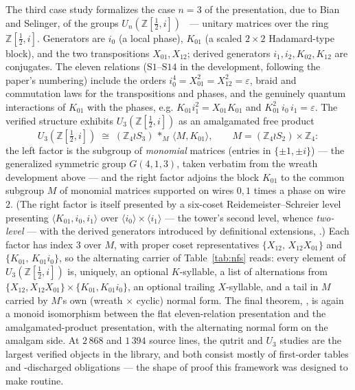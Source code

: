 The third case study formalizes the case $n = 3$ of the presentation, due
to Bian and Selinger, of the groups
$U_n(\mathbb{Z}[\tfrac12,i])$~\cite{bian2021un} --- unitary matrices over
the ring $\mathbb{Z}[\tfrac12,i]$.
Generators are $i_0$ (a local phase), $K_{01}$ (a scaled $2{\times}2$
Hadamard-type block), and the two transpositions $X_{01}, X_{12}$;
derived generators $i_1, i_2, K_{02}, K_{12}$ are conjugates.  The eleven
relations ($\mathrm{S1}$--$\mathrm{S14}$ in the development, following the
paper's numbering) include the orders $i_0^4 = X_{01}^2 = X_{12}^2 =
\varepsilon$, braid and commutation laws for the transpositions and
phases, and the genuinely quantum interactions of $K_{01}$ with the
phases, e.g.
$K_{01} i_1^2 = X_{01} K_{01}$ and
$K_{01}^2\, i_0\, i_1 = \varepsilon$.  The verified structure exhibits
$U_3(\mathbb{Z}[\tfrac12,i])$ as an amalgamated free product
\[
  U_3(\mathbb{Z}[\tfrac12,i]) \;\cong\;
  (\mathbb{Z}_4 \wr S_3)
  \,\ast_{M}\,
  \langle M, K_{01} \rangle,
  \qquad
  M = (\mathbb{Z}_4 \wr S_2) \times \mathbb{Z}_4 :
\]
the left factor is the subgroup of \emph{monomial} matrices (entries in
$\{\pm 1, \pm i\}$) --- the generalized symmetric group $G(4,1,3)$,
taken verbatim from the wreath development above --- and the right
factor adjoins the block $K_{01}$ to the common subgroup $M$ of
monomial matrices supported on wires $0, 1$ times a phase on wire $2$.
(The right factor is itself presented by a six-coset
Reidemeister--Schreier level presenting $\langle K_{01}, i_0, i_1
\rangle$ over $\langle i_0 \rangle \times \langle i_1 \rangle$ --- the
tower's second level, whence \emph{two-level} --- with the derived
generators introduced by definitional extensions, .)
Each factor has index $3$ over $M$, with proper coset representatives
$\{X_{12},\, X_{12}X_{01}\}$ and $\{K_{01},\, K_{01} i_0\}$, so the
alternating carrier of Table~\ref{tab:nfs} reads: every element of
$U_3(\mathbb{Z}[\tfrac12,i])$ is, uniquely, an optional $K$-syllable, a
list of alternations from
$\{X_{12}, X_{12}X_{01}\} \times \{K_{01}, K_{01} i_0\}$, an optional
trailing $X$-syllable, and a tail in $M$ carried by $M$'s own
(wreath $\times$ cyclic) normal form.  The final theorem,
, is again a monoid isomorphism between
the flat eleven-relation presentation and the amalgamated-product
presentation, with the alternating normal form on the amalgam side.  At
$2\,868$ and $1\,394$ source lines, the qutrit and $U_3$ studies are the
largest verified objects in the library, and both consist mostly of
first-order tables and -discharged obligations --- the shape of
proof this framework was designed to make routine.

